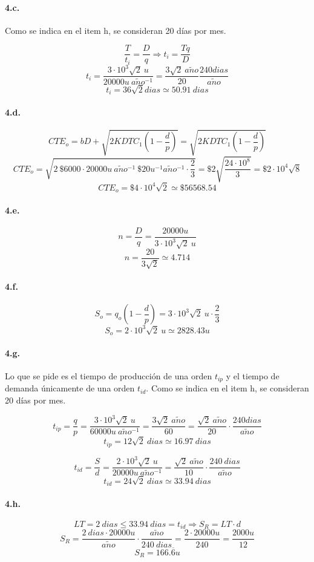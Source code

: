 \documentclass{article}
\def \anio {a\tilde{n}o}
\begin{document}
    \paragraph{4.c.}
        Como se indica en el item h, se consideran 20 días por mes.
        
        $$ \frac{T}{t_i} = \frac{D}{q} \Rightarrow t_i = \frac{Tq}{D} $$
        $$ t_i = \frac{3 \cdot 10^3 \sqrt{2}\ u}{20000u\ \anio^{-1}} = \frac{3 \sqrt{2}\ \anio}{20} \frac{240 dias}{\anio} $$
        $$ \boxed{ t_i = 36 \sqrt{2} dias \simeq 50.91\ dias } $$
    
    \paragraph{4.d.}
        $$ CTE_o = bD + \sqrt{ 2KDTC_1 \left( 1 - \frac{d}{p} \right) } = \sqrt{ 2KDTC_1 \left( 1 - \frac{d}{p} \right) } $$
        $$ CTE_o = \sqrt{ 2\ \$6000 \cdot 20000u\ \anio^{-1}\ \$20u^{-1}\anio^{-1} \cdot \frac{2}{3} } = \$2 \sqrt{ \frac{24 \cdot 10^8}{3} } = \$2 \cdot 10^4 \sqrt{8} $$
        $$ \boxed{ CTE_o = \$4 \cdot 10^4 \sqrt{2} \simeq \$ 56568.54 } $$

    \paragraph{4.e.}
        $$ n = \frac{D}{q} = \frac{20000u}{3 \cdot 10^3 \sqrt{2}\ u} $$
        $$ \boxed{ n = \frac{20}{3 \sqrt{2}} \simeq 4.714 } $$
    
    \paragraph{4.f.}
        $$ S_o = q_o \left( 1 - \frac{d}{p} \right) = 3 \cdot 10^3 \sqrt {2}\ u \cdot \frac{2}{3} $$
        $$ \boxed{ S_o = 2 \cdot 10^3 \sqrt {2}\ u \simeq 2828.43 u } $$
    
    \paragraph{4.g.}
        Lo que se pide es el tiempo de producción de una orden $ t_{ip} $ y el tiempo de demanda únicamente de una orden $ t_{id} $. Como se indica en el item h, se consideran 20 días por mes.
        
        $$ t_{ip} = \frac{q}{p} = \frac{3 \cdot 10^3 \sqrt {2}\ u}{60000u\ \anio^{-1}} = \frac{3 \sqrt {2}\ \anio}{60} = \frac{\sqrt{2}\ \anio}{20} \cdot \frac{240dias}{\anio}$$
        $$ \boxed{ t_{ip} = 12\sqrt{2}\ dias \simeq 16.97\ dias } $$
        
        $$ t_{id} = \frac{S}{d} = \frac{2 \cdot 10^3 \sqrt {2}\ u}{20000u\ \anio^{-1}} = \frac{\sqrt{2}\ \anio}{10} \cdot \frac{240\ dias}{\anio} $$
        $$ \boxed{ t_{id} = 24\sqrt{2}\ dias \simeq 33.94\ dias } $$
    
    \paragraph{4.h.}
        $$ LT = 2\ dias \leq 33.94\ dias = t_{id} \Rightarrow S_R = LT \cdot d $$
        $$ S_R = \frac{2\ dias \cdot 20000u}{\anio} \cdot \frac{\anio}{240\ dias} = \frac{2 \cdot 20000u}{240} = \frac{2000u}{12} $$
        $$ \boxed{S_R = 166.\overline{6} u} $$
\end{document}
